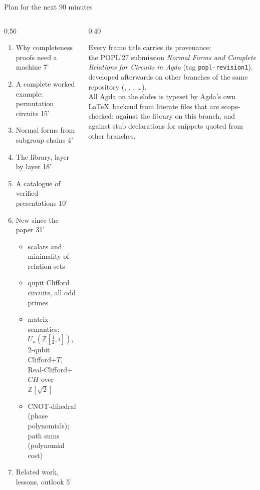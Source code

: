 
\begin{frame}{Plan for the next 90 minutes}
\begin{columns}[T]
\begin{column}{0.56\textwidth}
\small
\begin{enumerate}
  \setlength{\itemsep}{2pt}
  \item Why completeness proofs need a machine \hfill{\color{gray}\small 7'}
  \item A complete worked example: permutation circuits \hfill{\color{gray}\small 15'}
  \item Normal forms from subgroup chains \hfill{\color{gray}\small 4'}
  \item The library, layer by layer \hfill{\color{gray}\small 18'}
  \item A catalogue of verified presentations \hfill{\color{gray}\small 10'}
  \item {\color{newC}New since the paper} \hfill{\color{gray}\small 31'}
  \begin{itemize}
    \footnotesize
    \item scalars and \alert{minimality} of relation sets
    \item qupit Clifford circuits, all odd primes
    \item \alert{matrix semantics}: $U_n(\mathbb{Z}[\frac12,i])$, 2-qubit Clifford+$T$,
          Real-Clifford+$CH$ over $\mathbb{Z}[\sqrt2]$
    \item CNOT-dihedral (phase polynomials); path sums (polynomial cost)
  \end{itemize}
  \item Related work, lessons, outlook \hfill{\color{gray}\small 5'}
\end{enumerate}
\end{column}
\begin{column}{0.40\textwidth}
\begin{keybox}[title=How to read the slides]
\footnotesize
Every frame title carries its provenance:\\[4pt]
\; the POPL'27 submission
\emph{Normal Forms and Complete Relations for Circuits in Agda}
(tag \texttt{popl-revision1}).\\[4pt]
\; developed afterwards on other
branches of the same repository (,
, , \ldots).\\[4pt]
All Agda on the slides is typeset by Agda's own \LaTeX\ backend from
literate files that are scope-checked: against the library on this
branch, and against stub declarations for snippets quoted from other
branches.
\end{keybox}
\end{column}
\end{columns}
\end{frame}

